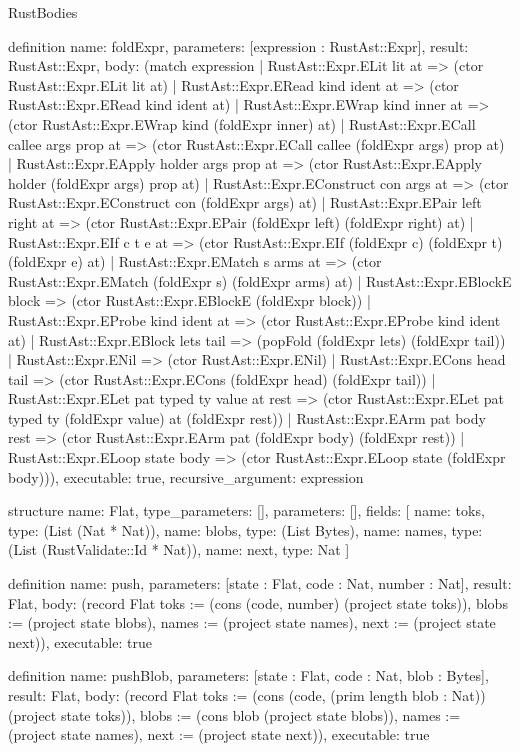 \begin{lexlean}{RustBodies}
\begin{semanticmodule}
definition{
  name: foldExpr,
  parameters: [expression : RustAst::Expr],
  result: RustAst::Expr,
  body: (match expression
    | RustAst::Expr.ELit lit at => (ctor RustAst::Expr.ELit lit at)
    | RustAst::Expr.ERead kind ident at => (ctor RustAst::Expr.ERead kind ident at)
    | RustAst::Expr.EWrap kind inner at => (ctor RustAst::Expr.EWrap kind (foldExpr inner) at)
    | RustAst::Expr.ECall callee args prop at => (ctor RustAst::Expr.ECall callee (foldExpr args) prop at)
    | RustAst::Expr.EApply holder args prop at => (ctor RustAst::Expr.EApply holder (foldExpr args) prop at)
    | RustAst::Expr.EConstruct con args at => (ctor RustAst::Expr.EConstruct con (foldExpr args) at)
    | RustAst::Expr.EPair left right at => (ctor RustAst::Expr.EPair (foldExpr left) (foldExpr right) at)
    | RustAst::Expr.EIf c t e at => (ctor RustAst::Expr.EIf (foldExpr c) (foldExpr t) (foldExpr e) at)
    | RustAst::Expr.EMatch s arms at => (ctor RustAst::Expr.EMatch (foldExpr s) (foldExpr arms) at)
    | RustAst::Expr.EBlockE block => (ctor RustAst::Expr.EBlockE (foldExpr block))
    | RustAst::Expr.EProbe kind ident at => (ctor RustAst::Expr.EProbe kind ident at)
    | RustAst::Expr.EBlock lets tail => (popFold (foldExpr lets) (foldExpr tail))
    | RustAst::Expr.ENil => (ctor RustAst::Expr.ENil)
    | RustAst::Expr.ECons head tail => (ctor RustAst::Expr.ECons (foldExpr head) (foldExpr tail))
    | RustAst::Expr.ELet pat typed ty value at rest => (ctor RustAst::Expr.ELet pat typed ty (foldExpr value) at (foldExpr rest))
    | RustAst::Expr.EArm pat body rest => (ctor RustAst::Expr.EArm pat (foldExpr body) (foldExpr rest))
    | RustAst::Expr.ELoop state body => (ctor RustAst::Expr.ELoop state (foldExpr body))),
  executable: true,
  recursive_argument: expression
}

structure{
  name: Flat,
  type_parameters: [],
  parameters: [],
  fields: [
    {name: toks, type: (List (Nat * Nat))},
    {name: blobs, type: (List Bytes)},
    {name: names, type: (List (RustValidate::Id * Nat))},
    {name: next, type: Nat}
  ]
}

definition{
  name: push,
  parameters: [state : Flat, code : Nat, number : Nat],
  result: Flat,
  body: (record Flat {toks := (cons (code, number) (project state toks)), blobs := (project state blobs), names := (project state names), next := (project state next)}),
  executable: true
}

definition{
  name: pushBlob,
  parameters: [state : Flat, code : Nat, blob : Bytes],
  result: Flat,
  body: (record Flat {toks := (cons (code, (prim length blob : Nat)) (project state toks)), blobs := (cons blob (project state blobs)), names := (project state names), next := (project state next)}),
  executable: true
}


\end{semanticmodule}
\end{lexlean}
